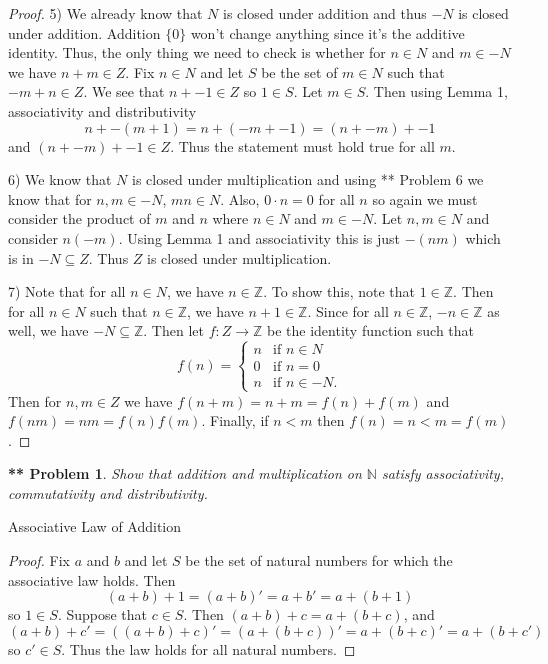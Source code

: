 \documentclass{article}
\newtheorem{**}{** Problem}
\begin{document}
\begin{flushleft}
\begin{proof}
5) We already know that $N$ is closed under addition and thus $-N$ is closed under addition. Addition $\{0\}$ won't change anything since it's the additive identity. Thus, the only thing we need to check is whether for $n \in N$ and $m \in -N$ we have $n + m \in Z$. Fix $n \in N$ and let $S$ be the set of $m \in N$ such that $-m + n \in Z$. We see that $n + -1 \in Z$ so $1 \in S$. Let $m \in S$. Then using Lemma 1, associativity and distributivity
\[
n + -(m+1) = n + (-m + -1) = (n + -m) + -1
\]
and $(n + -m) + -1 \in Z$. Thus the statement must hold true for all $m$.\newline

6) We know that $N$ is closed under multiplication and using ** Problem 6 we know that for $n,m \in -N$, $mn \in N$. Also, $0 \cdot n = 0$ for all $n$ so again we must consider the product of $m$ and $n$ where $n \in N$ and $m \in -N$. Let $n,m \in N$ and consider $n(-m)$. Using Lemma 1 and associativity this is just $-(nm)$ which is in $-N \subseteq Z$. Thus $Z$ is closed under multiplication.\newline

7) Note that for all $n \in N$, we have $n \in \mathbb{Z}$. To show this, note that $1 \in \mathbb{Z}$. Then for all $n \in N$ such that $n \in \mathbb{Z}$, we have $n + 1 \in \mathbb{Z}$. Since for all $n \in \mathbb{Z}$, $-n \in \mathbb{Z}$ as well, we have $-N \subseteq \mathbb{Z}$. Then let $f : Z \rightarrow \mathbb{Z}$ be the identity function such that
\[
f(n) =
\begin{cases}
n & \text{if $n \in N$}\\
0 & \text{if $n = 0$}\\
n & \text{if $n \in -N$}.
\end{cases}
\]
Then for $n,m \in Z$ we have $f(n+m) = n + m = f(n) + f(m)$ and $f(nm) = nm = f(n)f(m)$. Finally, if $n < m$ then $f(n) = n < m = f(m)$.
\end{proof}

\begin{**}
Show that addition and multiplication on $\mathbb{N}$ satisfy associativity, commutativity and distributivity.\newline
\end{**}

Associative Law of Addition
\begin{proof}
Fix $a$ and $b$ and let $S$ be the set of natural numbers for which the associative law holds. Then
\[
(a+b)+1 = (a+b)' = a + b' = a + (b+1)
\]
so $1 \in S$. Suppose that $c \in S$. Then $(a + b) + c = a + (b + c)$, and
\[
(a + b) + c' = ((a + b) + c)' = (a + (b + c))' = a + (b + c)' = a + (b + c')
\]
so $c' \in S$. Thus the law holds for all natural numbers.
\end{proof}


\end{flushleft}
\end{document}
